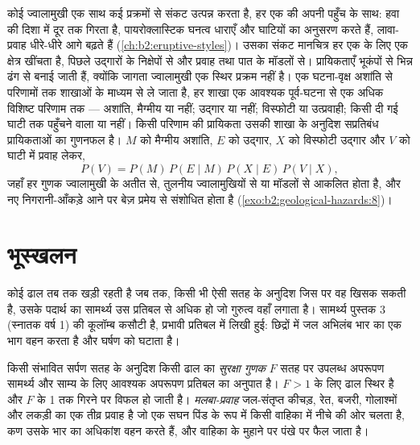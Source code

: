 कोई ज्वालामुखी एक साथ कई प्रक्रमों से संकट उत्पन्न करता है, हर एक की अपनी पहुँच के साथ:  हवा की दिशा में
दूर तक गिरता है, पायरोक्लास्टिक घनत्व धाराएँ और  घाटियों का अनुसरण करते हैं, लावा-प्रवाह धीरे-धीरे आगे बढ़ते हैं
(\cref{ch:b2:eruptive-styles})। उसका संकट मानचित्र हर एक के लिए एक क्षेत्र खींचता है, पिछले
उद्गारों के निक्षेपों से और प्रवाह तथा पात के मॉडलों से। प्रायिकताएँ भूकंपों से भिन्न ढंग से
बनाई जाती हैं, क्योंकि जागता ज्वालामुखी एक स्थिर प्रक्रम नहीं है। एक घटना-वृक्ष
अशांति से परिणामों तक शाखाओं के माध्यम से ले जाता है, हर शाखा एक आवश्यक पूर्व-घटना से एक अधिक विशिष्ट
परिणाम तक --- अशांति, मैग्मीय या नहीं; उद्गार या नहीं; विस्फोटी या उत्प्रवाही; किसी दी गई घाटी तक
पहुँचने वाला  या नहीं। किसी परिणाम की प्रायिकता उसकी शाखा के अनुदिश सप्रतिबंध
प्रायिकताओं का गुणनफल है। $M$ को मैग्मीय अशांति, $E$ को उद्गार, $X$ को विस्फोटी
उद्गार और $V$ को घाटी में प्रवाह लेकर,
\begin{equation*}
P(V) = P(M) \, P(E \mid M) \, P(X \mid E) \, P(V \mid X),
\end{equation*}
जहाँ हर गुणक ज्वालामुखी के अतीत से, तुलनीय ज्वालामुखियों से या मॉडलों से आकलित होता है, और नए निगरानी-आँकड़े आने पर
बेज़ प्रमेय से संशोधित होता है (\cref{exo:b2:geological-hazards:8})।

\section{भूस्खलन}\label{sec:b2:geological-hazards:landslides}

कोई ढाल तब तक खड़ी रहती है जब तक, किसी भी ऐसी सतह के अनुदिश जिस पर वह खिसक सकती है, उसके पदार्थ का
सामर्थ्य उस प्रतिबल से अधिक हो जो गुरुत्व वहाँ लगाता है। सामर्थ्य पुस्तक 3 (स्नातक वर्ष 1) की कूलॉम्ब
कसौटी है, प्रभावी प्रतिबल में लिखी हुई: छिद्रों में जल अभिलंब भार का एक भाग वहन करता है और
घर्षण को घटाता है।

\begin{definition}[सुरक्षा गुणक, मलबा-प्रवाह]\label{def:b2:geological-hazards:slope}
किसी संभावित सर्पण सतह के अनुदिश किसी ढाल का \emph{सुरक्षा गुणक} $F$
सतह पर उपलब्ध अपरूपण सामर्थ्य और साम्य के लिए आवश्यक अपरूपण प्रतिबल का
अनुपात है। $F > 1$ के लिए ढाल स्थिर है और $F$ के 1 तक गिरने पर विफल हो जाती है। \emph{मलबा-प्रवाह}
जल-संतृप्त कीचड़, रेत, बजरी, गोलाश्मों और लकड़ी का एक तीव्र प्रवाह है
जो एक सघन पिंड के रूप में किसी वाहिका में नीचे की ओर चलता है, कण उसके भार का अधिकांश वहन करते हैं, और
वाहिका के मुहाने पर पंखे पर फैल जाता है।
\end{definition}

